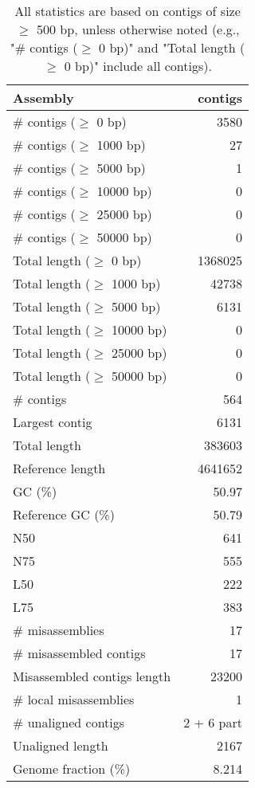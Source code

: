 \documentclass[12pt,a4paper]{article}
\begin{document}
\begin{table}[ht]
\begin{center}
\caption{All statistics are based on contigs of size $\geq$ 500 bp, unless otherwise noted (e.g., "\# contigs ($\geq$ 0 bp)" and "Total length ($\geq$ 0 bp)" include all contigs).}
\begin{tabular}{|l*{1}{|r}|}
\hline
Assembly & contigs \\ \hline
\# contigs ($\geq$ 0 bp) & 3580 \\ \hline
\# contigs ($\geq$ 1000 bp) & 27 \\ \hline
\# contigs ($\geq$ 5000 bp) & 1 \\ \hline
\# contigs ($\geq$ 10000 bp) & 0 \\ \hline
\# contigs ($\geq$ 25000 bp) & 0 \\ \hline
\# contigs ($\geq$ 50000 bp) & 0 \\ \hline
Total length ($\geq$ 0 bp) & 1368025 \\ \hline
Total length ($\geq$ 1000 bp) & 42738 \\ \hline
Total length ($\geq$ 5000 bp) & 6131 \\ \hline
Total length ($\geq$ 10000 bp) & 0 \\ \hline
Total length ($\geq$ 25000 bp) & 0 \\ \hline
Total length ($\geq$ 50000 bp) & 0 \\ \hline
\# contigs & 564 \\ \hline
Largest contig & 6131 \\ \hline
Total length & 383603 \\ \hline
Reference length & 4641652 \\ \hline
GC (\%) & 50.97 \\ \hline
Reference GC (\%) & 50.79 \\ \hline
N50 & 641 \\ \hline
N75 & 555 \\ \hline
L50 & 222 \\ \hline
L75 & 383 \\ \hline
\# misassemblies & 17 \\ \hline
\# misassembled contigs & 17 \\ \hline
Misassembled contigs length & 23200 \\ \hline
\# local misassemblies & 1 \\ \hline
\# unaligned contigs & 2 + 6 part \\ \hline
Unaligned length & 2167 \\ \hline
Genome fraction (\%) & 8.214 \\ \hline

\end{tabular}
\end{center}
\end{table}
\end{document}
